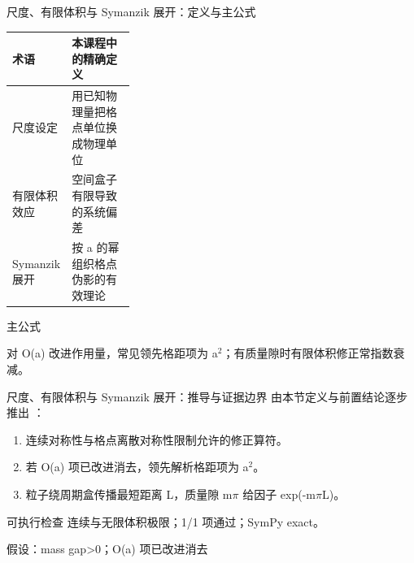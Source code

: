 \begin{frame}[t]{尺度、有限体积与 Symanzik 展开：定义与主公式}
\footnotesize\begin{tabularx}{\linewidth}{p{0.30\linewidth}Y}
\toprule 术语 & 本课程中的精确定义\\\midrule
{} 尺度设定 & 用已知物理量把格点单位换成物理单位\\
 有限体积效应 & 空间盒子有限导致的系统偏差\\
 Symanzik 展开 & 按 a 的幂组织格点伪影的有效理论\\
\bottomrule\end{tabularx}\vspace{0.15cm}
\begin{block}{ 主公式}\centering{}\end{block}
对 O(a) 改进作用量，常见领先格距项为 a\ensuremath{^{2}}；有质量隙时有限体积修正常指数衰减。
\end{frame}

\begin{frame}[t]{尺度、有限体积与 Symanzik 展开：推导与证据边界}
\footnotesize
{}\quad 由本节定义与前置结论逐步推出 ：
\begin{enumerate}
\item 连续对称性与格点离散对称性限制允许的修正算符。
\item 若 O(a) 项已改进消去，领先解析格距项为 a\ensuremath{^{2}}。
\item 粒子绕周期盒传播最短距离 L，质量隙 m\ensuremath{\pi} 给因子 exp(-m\ensuremath{\pi}L)。
\end{enumerate}\begin{block}{可执行检查}
\quad 连续与无限体积极限；1/1 项通过；SymPy exact。
\par\scriptsize 假设：mass gap>0；O(a) 项已改进消去
\end{block}
\end{frame}

